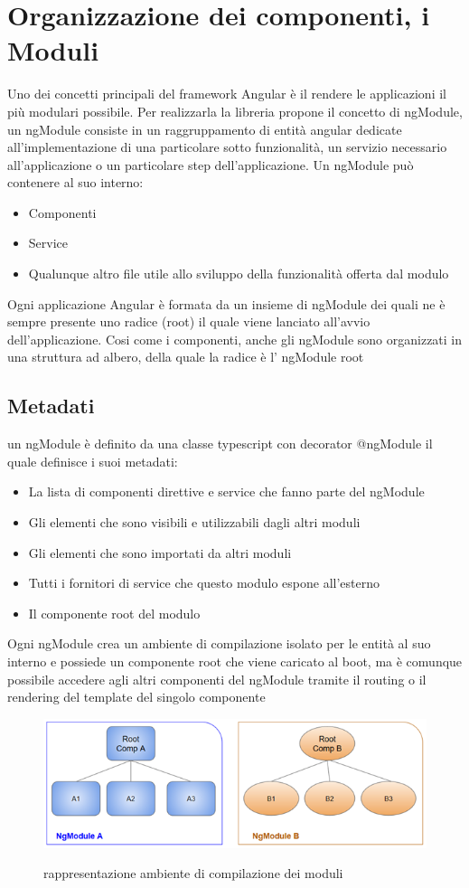 \section{Organizzazione dei componenti, i Moduli}
Uno dei concetti principali del framework Angular è il rendere le applicazioni il più modulari possibile. Per realizzarla la libreria propone il concetto di ngModule, un ngModule consiste in un raggruppamento di entità angular dedicate all'implementazione di una particolare sotto funzionalità, un servizio necessario all'applicazione o un particolare step dell'applicazione.
Un ngModule può contenere al suo interno:
\begin{itemize}
    \item Componenti
    \item Service
    \item Qualunque altro file utile allo sviluppo della funzionalità offerta dal modulo
\end{itemize}
Ogni applicazione Angular è formata da un insieme di ngModule dei quali ne è sempre presente uno radice (root) il quale viene lanciato all'avvio dell'applicazione.
Cosi come i componenti, anche gli ngModule sono organizzati in una struttura ad albero,
della quale la radice è l' ngModule root
\subsection{Metadati}
un ngModule è definito da una classe typescript con decorator @ngModule il quale definisce i suoi metadati:
\begin{itemize}
    \item La lista di componenti direttive e service che fanno parte del ngModule
    \item Gli elementi che sono visibili e utilizzabili dagli altri moduli
    \item Gli elementi che sono importati da altri moduli
    \item Tutti i fornitori di service che questo modulo espone all'esterno
    \item Il componente root del modulo
\end{itemize}
Ogni ngModule crea un ambiente di compilazione isolato per le entità al suo interno e possiede un componente root che viene caricato al boot, ma è comunque possibile accedere agli altri componenti del ngModule tramite il routing o il rendering del template del singolo componente
\begin{figure}[H]
    \centering
   \includegraphics[scale=1]{resources/compilation-context.png}
   \cite{angular-doc}
    \caption{rappresentazione ambiente di compilazione dei moduli}
\end{figure}


